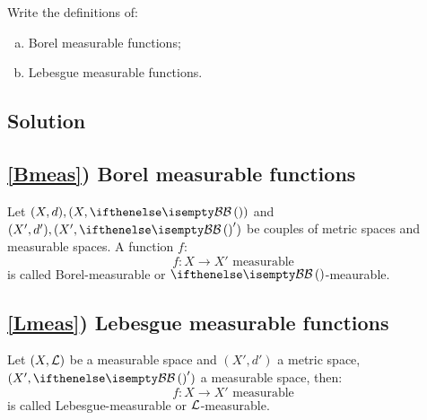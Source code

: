 

\question

Write the definitions of:
\begin{enumerate}[a)]
    \item \label{Bmeas} Borel measurable functions;
    \item \label{Lmeas} Lebesgue measurable functions.
\end{enumerate}

\subsection*{Solution}

\subsection{\ref{Bmeas}) Borel measurable functions}
Let $(X,d), (X,\B)$ and $(X',d'), (X', \B')$ be couples of metric spaces and measurable spaces. A function $f$:
\[
    f:X\to X' \text{ measurable}
\]
is called Borel-measurable or $\B$-meaurable.

\subsection{\ref{Lmeas}) Lebesgue measurable functions}
Let $(X,\mathcal{L})$ be a measurable space and $(X',d')$ a metric space, $(X',\B')$ a measurable space, then:
\[
    f:X\to X' \text{ measurable}
\]
is called Lebesgue-measurable or $\mathcal{L}$-measurable.